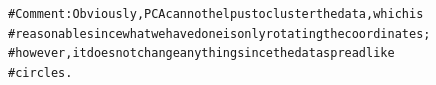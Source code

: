 \documentclass{article}\usepackage[]{graphicx}\usepackage[]{color}
\makeatletter
\newenvironment{kframe}{%
 \def\at@end@of@kframe{}%
 \ifinner\ifhmode%
  \def\at@end@of@kframe{\end{minipage}}%
  \begin{minipage}{\columnwidth}%
 \fi\fi%
 \def\FrameCommand##1{\hskip\@totalleftmargin \hskip-\fboxsep
 \colorbox{shadecolor}{##1}\hskip-\fboxsep
     \hskip-\linewidth \hskip-\@totalleftmargin \hskip\columnwidth}%
 \MakeFramed {\advance\hsize-\width
   \@totalleftmargin\z@ \linewidth\hsize
   \@setminipage}}%
 {\par\unskip\endMakeFramed%
 \at@end@of@kframe}
\newenvironment{knitrout}{}{} %
\makeatother
\begin{document}
\begin{knitrout}
{}


\begin{kframe}\begin{alltt}
# Comment: Obviously, PCA cannot help us to cluster the data, which is
# reasonable since what we have done is only rotating the coordinates;
# however, it does not change anything since the data spread like
# circles.
\end{alltt}
\end{kframe}
\end{knitrout}
\end{document}

